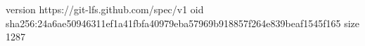 version https://git-lfs.github.com/spec/v1
oid sha256:24a6ae50946311ef1a41fbfa40979eba57969b918857f264e839beaf1545f165
size 1287
